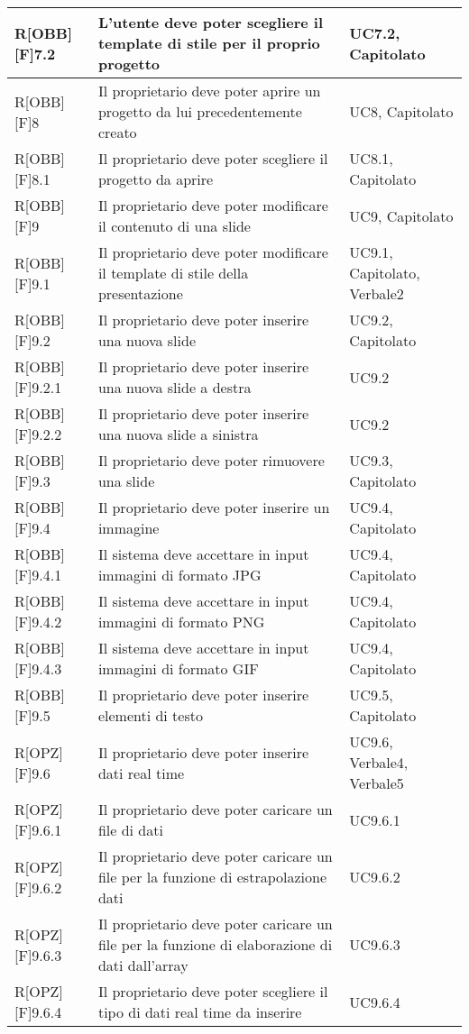 	\begin{table}[h]
		\begin{tabular}{|p{}|p{}|p{}|}
			\midrule
			
			R[OBB][F]7.2 & L'utente deve poter scegliere il \gls{template} di stile per il proprio progetto & UC7.2, Capitolato \\ \midrule
			R[OBB][F]8 & Il proprietario deve poter aprire un progetto da lui precedentemente creato & UC8, Capitolato \\ \midrule
			R[OBB][F]8.1 & Il proprietario deve poter scegliere il progetto da aprire & UC8.1, Capitolato \\ \midrule
			R[OBB][F]9 & Il proprietario deve poter modificare il contenuto di una \gls{slide} & UC9, Capitolato \\ \midrule
			R[OBB][F]9.1 & Il proprietario deve poter modificare il \gls{template} di stile della presentazione & UC9.1, Capitolato, Verbale2 \\ \midrule
			R[OBB][F]9.2 & Il proprietario deve poter inserire una nuova \gls{slide} & UC9.2, Capitolato \\ \midrule
			R[OBB][F]9.2.1 & Il proprietario deve poter inserire una nuova \gls{slide} a destra & UC9.2 \\ \midrule
			R[OBB][F]9.2.2 & Il proprietario deve poter inserire una nuova \gls{slide} a sinistra & UC9.2 \\ \midrule
			R[OBB][F]9.3 & Il proprietario deve poter rimuovere una \gls{slide} & UC9.3, Capitolato \\ \midrule
			R[OBB][F]9.4 & Il proprietario deve poter inserire un immagine & UC9.4, Capitolato \\ \midrule
			R[OBB][F]9.4.1 & Il sistema deve accettare in input immagini di formato JPG & UC9.4, Capitolato \\ \midrule
			R[OBB][F]9.4.2 & Il sistema deve accettare in input immagini di formato \gls{PNG} & UC9.4, Capitolato \\ \midrule
			R[OBB][F]9.4.3 & Il sistema deve accettare in input immagini di formato GIF & UC9.4, Capitolato \\ \midrule
			R[OBB][F]9.5 & Il proprietario deve poter inserire elementi di testo & UC9.5, Capitolato \\ \midrule
			R[OPZ][F]9.6 & Il proprietario deve poter inserire dati \gls{real time} & UC9.6, Verbale4, Verbale5 \\ \midrule
			R[OPZ][F]9.6.1 & Il proprietario deve poter caricare un file di dati & UC9.6.1 \\ \midrule
			R[OPZ][F]9.6.2 & Il proprietario deve poter caricare un file per la funzione di estrapolazione dati & UC9.6.2 \\ \midrule
			R[OPZ][F]9.6.3 & Il proprietario deve poter caricare un file per la funzione di elaborazione di dati dall'array & UC9.6.3 \\ \midrule
			R[OPZ][F]9.6.4 & Il proprietario deve poter scegliere il tipo di dati real time da inserire & UC9.6.4 \\ \midrule

		\end{tabular}
	\end{table}
	\newpage
	
